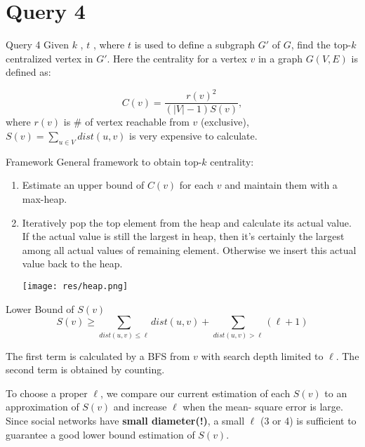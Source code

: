

\section{Query 4}
\begin{frame}{Query 4}
  Given $k$ , $t$ , where $t$ is used to define a subgraph $G′$ of $G$, find
  the top-$k$ centralized vertex in $G′$. Here the centrality for a
  vertex $v$ in a graph $G(V, E)$ is defined as:

  \[ C(v) = \dfrac{r(v)^2}{(|V| - 1) S(v)},\]
    where $ r(v)$ is \# of vertex reachable from $v$ (exclusive),
 $ S(v) = \sum_{u\in V} dist(u, v) $ is very expensive to calculate.

\end{frame}

\begin{frame}{Framework}
  General framework to obtain top-$k$ centrality:
  \begin{enumerate}
    \item
      Estimate an upper bound of $C(v)$
      for each $v$ and maintain them with a max-heap.

    \item

      Iteratively pop the top element from the heap and calculate
      its actual value. If the actual value is still the largest in
      heap, then it's certainly the largest among all actual values
      of remaining element. Otherwise we insert this actual value
      back to the heap.
      \begin{center}
        \texttt{[image: res/heap.png]}
      \end{center}
  \end{enumerate}

\end{frame}

\begin{frame}{Lower Bound of $ S(v)$}
  \[ S(v) \ge \sum_{dist(u, v) \le \ell}dist(u, v) + \sum_{dist(u,v)>\ell}(\ell + 1) \]

The first term is calculated by a BFS from $v$ with search depth
limited to $\ell$. The second term is obtained by counting.

To choose a proper $\ell$, we compare our current estimation of each
$S(v)$ to an approximation of $S(v)$ and increase $\ell$ when the mean-
square error is large. Since social networks have \textbf{small
  diameter(!)}, a small $\ell$ (3 or 4) is sufficient to guarantee a good
lower bound estimation of $S(v)$.

\end{frame}

